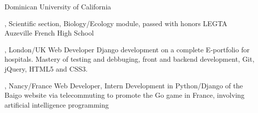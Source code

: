 \documentclass[english]{ecv}
\begin{document}
\begin{ecv}
                {}
                {Dominican University of California}

                {, Scientific section, Biology/Ecology
                module, passed with honors}
                {LEGTA Auzeville French High School}

             

             


\ecvPageBreak


                 {, London/UK}
                 {Web Developer}
                 {Django development on a complete E-portfolio for hospitals.
                   Mastery of testing and debbuging, front and backend
                   development, Git, jQuery, HTML5 and CSS3.
                 }

                 {, Nancy/France}
                 {Web Developer, Intern}
                 {Development in Python/Django of the Baigo website via
                   telecommuting to promote the Go game in France,
                   involving artificial intelligence programming
                 }


\end{ecv}
\end{document}
